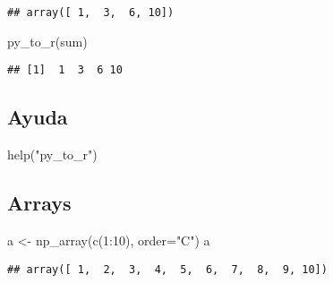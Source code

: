\documentclass[
]{article}
\newenvironment{Shaded}{\begin{snugshade}}{\end{snugshade}}
\newcommand{\AttributeTok}[1]{\textcolor[rgb]{0.77,0.63,0.00}{#1}}
\newcommand{\DecValTok}[1]{\textcolor[rgb]{0.00,0.00,0.81}{#1}}
\newcommand{\FunctionTok}[1]{\textcolor[rgb]{0.00,0.00,0.00}{#1}}
\newcommand{\NormalTok}[1]{#1}
\newcommand{\OtherTok}[1]{\textcolor[rgb]{0.56,0.35,0.01}{#1}}
\newcommand{\SpecialCharTok}[1]{\textcolor[rgb]{0.00,0.00,0.00}{#1}}
\newcommand{\StringTok}[1]{\textcolor[rgb]{0.31,0.60,0.02}{#1}}
\begin{document}
\begin{verbatim}
## array([ 1,  3,  6, 10])
\end{verbatim}

\begin{Shaded}
\begin{Highlighting}[]
\FunctionTok{py\_to\_r}\NormalTok{(sum)}
\end{Highlighting}
\end{Shaded}

\begin{verbatim}
## [1]  1  3  6 10
\end{verbatim}

\hypertarget{ayuda}{%
\subsection{Ayuda}\label{ayuda}}

\begin{Shaded}
\end{Shaded}

\begin{Shaded}
\begin{Highlighting}[]
\FunctionTok{help}\NormalTok{(}\StringTok{"py\_to\_r"}\NormalTok{)}
\end{Highlighting}
\end{Shaded}

\hypertarget{arrays}{%
\subsection{Arrays}\label{arrays}}

\begin{Shaded}
\begin{Highlighting}[]
\NormalTok{a }\OtherTok{\textless{}{-}} \FunctionTok{np\_array}\NormalTok{(}\FunctionTok{c}\NormalTok{(}\DecValTok{1}\SpecialCharTok{:}\DecValTok{10}\NormalTok{), }\AttributeTok{order=}\StringTok{"C"}\NormalTok{)}
\NormalTok{a}
\end{Highlighting}
\end{Shaded}

\begin{verbatim}
## array([ 1,  2,  3,  4,  5,  6,  7,  8,  9, 10])
\end{verbatim}

\cdot
\end{document}
